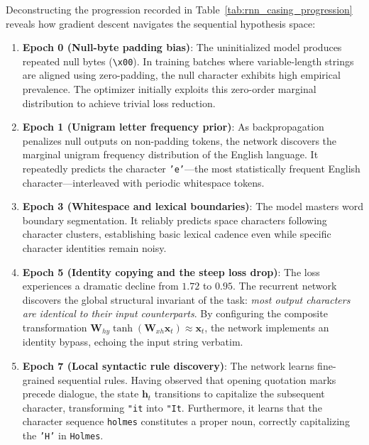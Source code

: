 \documentclass[../../main.tex]{subfiles}
\begin{document}
Deconstructing the progression recorded in Table~\ref{tab:rnn_casing_progression} reveals how gradient descent navigates the sequential hypothesis space:
\begin{enumerate}
    \item \textbf{Epoch 0 (Null-byte padding bias)}: The uninitialized model produces repeated null bytes (\texttt{\textbackslash x00}). In training batches where variable-length strings are aligned using zero-padding, the null character exhibits high empirical prevalence. The optimizer initially exploits this zero-order marginal distribution to achieve trivial loss reduction.
    \item \textbf{Epoch 1 (Unigram letter frequency prior)}: As backpropagation penalizes null outputs on non-padding tokens, the network discovers the marginal unigram frequency distribution of the English language. It repeatedly predicts the character \texttt{'e'}—the most statistically frequent English character—interleaved with periodic whitespace tokens.
    \item \textbf{Epoch 3 (Whitespace and lexical boundaries)}: The model masters word boundary segmentation. It reliably predicts space characters following character clusters, establishing basic lexical cadence even while specific character identities remain noisy.
    \item \textbf{Epoch 5 (Identity copying and the steep loss drop)}: The loss experiences a dramatic decline from $1.72$ to $0.95$. The recurrent network discovers the global structural invariant of the task: \textit{most output characters are identical to their input counterparts}. By configuring the composite transformation $\mathbf{W}_{hy} \tanh(\mathbf{W}_{xh} \mathbf{x}_t) \approx \mathbf{x}_t$, the network implements an identity bypass, echoing the input string verbatim.
    \item \textbf{Epoch 7 (Local syntactic rule discovery)}: The network learns fine-grained sequential rules. Having observed that opening quotation marks precede dialogue, the state $\mathbf{h}_t$ transitions to capitalize the subsequent character, transforming \texttt{"it} into \texttt{"It}. Furthermore, it learns that the character sequence \texttt{holmes} constitutes a proper noun, correctly capitalizing the \texttt{'H'} in \texttt{Holmes}.
\end{enumerate}
\end{document}
